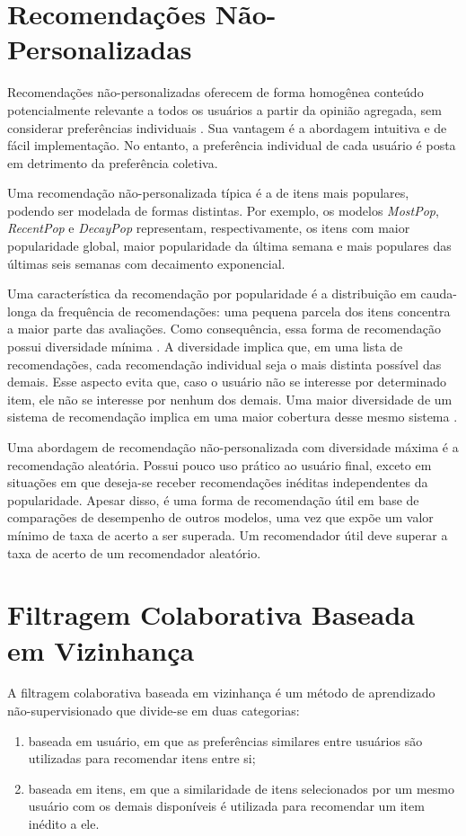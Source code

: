 \section{Recomendações Não-Personalizadas}
Recomendações não-personalizadas oferecem de forma homogênea conteúdo
potencialmente relevante a todos os usuários a partir da opinião agregada, sem
considerar preferências individuais \cite{poriya2014non}. Sua vantagem é a
abordagem intuitiva e de fácil implementação. No entanto, a preferência
individual de cada usuário é posta em detrimento da preferência coletiva.

Uma recomendação não-personalizada típica é a de itens mais populares, podendo
ser modelada de formas distintas. Por exemplo, os modelos \textit{MostPop},
\textit{RecentPop} e \textit{DecayPop} \cite{ji2020re, jing2023capturing}
representam, respectivamente, os itens com maior popularidade global, maior
popularidade da última semana e mais populares das últimas seis semanas com
decaimento exponencial.

Uma característica da recomendação por popularidade é a distribuição em
cauda-longa da frequência de recomendações: uma pequena parcela dos itens
concentra a maior parte das avaliações. Como consequência, essa forma de
recomendação possui diversidade mínima \cite{aggarwal2016recommender}. A
diversidade implica que, em uma lista de recomendações, cada recomendação
individual seja o mais distinta possível das demais. Esse aspecto evita que,
caso o usuário não se interesse por determinado item, ele não se interesse por
nenhum dos demais. Uma maior diversidade de um sistema de recomendação implica
em uma maior cobertura desse mesmo sistema \cite{aggarwal2016recommender}.

Uma abordagem de recomendação não-personalizada com diversidade máxima é a
recomendação aleatória. Possui pouco uso prático ao usuário final, exceto em
situações em que deseja-se receber recomendações inéditas independentes da
popularidade. Apesar disso, é uma forma de recomendação útil em base de
comparações de desempenho de outros modelos, uma vez que expõe um valor mínimo
de taxa de acerto a ser superada. Um recomendador útil deve superar a taxa de
acerto de um recomendador aleatório.

\section{Filtragem Colaborativa Baseada em Vizinhança} A filtragem
colaborativa baseada em vizinhança é um método de aprendizado não-supervisionado
que divide-se em duas categorias:
\begin{enumerate}
    \item baseada em usuário, em
que as preferências similares entre usuários são utilizadas para recomendar
itens entre si;
    \item baseada em itens, em que a similaridade de itens selecionados
por um mesmo usuário com os demais disponíveis é utilizada para recomendar um
item inédito a ele.
\end{enumerate}

